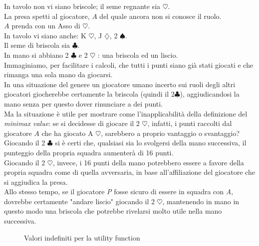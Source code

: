 In tavolo non vi siano briscole; il seme regnante sia $\heartsuit$.\\
La presa spetti al giocatore, $A$ del quale ancora non si conosce il ruolo.\\
$A$ prenda con un Asso di $\heartsuit$.\\
In tavolo vi siano anche: K $\heartsuit$, J $\diamondsuit$, 2 $\spadesuit$.\\
Il seme di briscola sia $\clubsuit$.\\
In mano si abbiano 2 $\clubsuit$ e 2 $\heartsuit$ : una briscola ed un liscio.\\
Immaginiamo, per facilitare i calcoli, che tutti i punti siano già stati giocati e che rimanga una sola mano da giocarsi.\\
In una situazione del genere un giocatore umano incerto sui ruoli degli altri giocatori giocherebbe certamente la briscola (quindi il 2$\clubsuit$), aggiudicandosi la mano senza per questo dover rinunciare a dei punti.\\
Ma la situazione è utile per mostrare come l'inapplicabilità della definizione del \emph{minimax value}: se si decidesse di giocare il 2 $\heartsuit$, infatti, i punti raccolti dal giocatore $A$ che ha giocato A $\heartsuit$, sarebbero a proprio vantaggio o svantaggio?\\
Giocando il 2 $\clubsuit$ si è certi che, qualsiasi sia lo svolgersi della mano successiva, il punteggio della propria squadra aumenterà di 16 punti.\\
Giocando il 2 $\heartsuit$, invece, i 16 punti della mano potrebbero essere a favore della propria squadra come di quella avversaria, in base all'affiliazione del giocatore che si aggiudica la presa.\\
Allo stesso tempo, se il giocatore \emph{P} fosse sicuro di essere in squadra con \emph{A}, dovrebbe certamente "andare liscio" giocando il 2 $\heartsuit$, mantenendo in mano in questo modo una briscola che potrebbe rivelarsi molto utile nella mano successiva.


\begin{figure}[!htbp]

\caption{Valori indefiniti per la utility function}
\label{alberoutility}
\end{figure}




